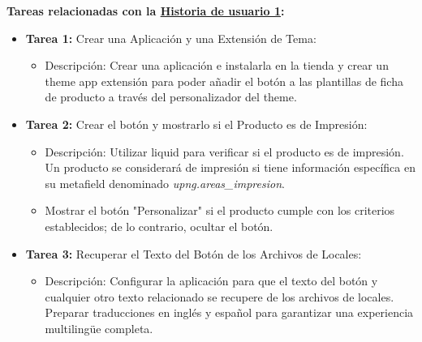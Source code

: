 \documentclass[12pt]{article}
\begin{document}
\textbf{Tareas relacionadas con la \hyperref[sec:historia1]{Historia de usuario 1}:}
\begin{itemize}
    \item \textbf{Tarea 1:} Crear una Aplicación y una Extensión de Tema:
          \begin{itemize}[label=--]
              \item Descripción: Crear una aplicación e instalarla en la tienda y crear un theme app extensión para poder añadir el botón a las plantillas de ficha de producto a través del personalizador del theme.
          \end{itemize}
    \item \textbf{Tarea 2:} Crear el botón y mostrarlo si el Producto es de Impresión:
          \begin{itemize}[label=--]
              \item Descripción: Utilizar liquid para verificar si el producto es de impresión. Un producto se considerará de impresión si tiene información específica en su metafield denominado \textit{upng.areas\_impresion}.
              \item Mostrar el botón "Personalizar" si el producto cumple con los criterios establecidos; de lo contrario, ocultar el botón.
          \end{itemize}
    \item \textbf{Tarea 3:} Recuperar el Texto del Botón de los Archivos de Locales:
          \begin{itemize}[label=--]
              \item Descripción: Configurar la aplicación para que el texto del botón y cualquier otro texto relacionado se recupere de los archivos de locales. Preparar traducciones en inglés y español para garantizar una experiencia multilingüe completa.
          \end{itemize}
\end{itemize}
\end{document}
